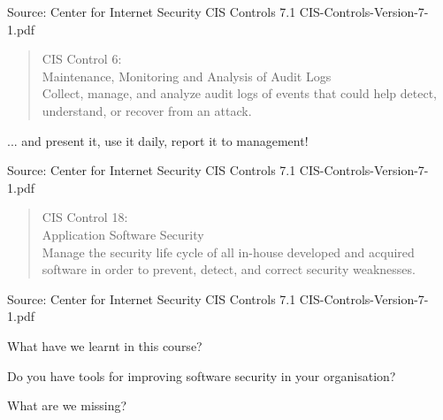 \documentclass[Screen16to9,17pt]{foils}
\begin{document}
\begin{list1}
\item
\item
\item
\item
\end{list1}

Source: Center for Internet Security CIS Controls 7.1 CIS-Controls-Version-7-1.pdf


\begin{quote}
CIS Control 6:\\
Maintenance, Monitoring and Analysis of Audit Logs\\
Collect, manage, and analyze audit logs of events that could help detect, understand, or recover from an attack.
\end{quote}

\begin{list1}
\item ... and present it, use it daily, report it to management!
\item
\item
\item
\end{list1}

Source: Center for Internet Security CIS Controls 7.1 CIS-Controls-Version-7-1.pdf



\begin{quote}
CIS Control 18:\\
Application Software Security\\
Manage the security life cycle of all in-house developed and acquired software in order to prevent, detect, and correct security weaknesses.
\end{quote}

\begin{list1}
\item
\item
\item
\item
\end{list1}

Source: Center for Internet Security CIS Controls 7.1 CIS-Controls-Version-7-1.pdf


\begin{list2}
\item What have we learnt in this course?
\item Do you have tools for improving software security in your organisation?
\item What are we missing?
\end{list2}

\slidenext{}
\end{document}
